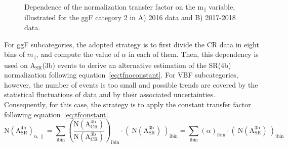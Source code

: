 \begin{figure}[htbp!]
\captionsetup[subfigure]{justification=centering}
\begin{center}
\end{center}
\caption[Dependence of the normalization transfer factor on the $\mathrm{m_{\parallel}}$ variable]{Dependence of the normalization transfer factor on the $\mathrm{m_{\parallel}}$ variable, illustrated for the ggF category 2 in A) 2016 data and B) 2017-2018 data.}
\label{fig:bkg:mdep_SF}
\end{figure}

For ggF subcategories, the adopted strategy is to first divide the CR data in eight bins of $m_{\parallel}$, and compute the value of $\alpha$ in each of them. Then, this dependency is used on $\mathrm{A_{SR}}$(3b) events to derive an alternative estimation of the SR(4b) normalization following equation~\ref{eq:tfnoconstant}. For VBF subcategories, however, the number of events is too small and possible trends are covered by the statistical fluctuations of data and by their associated uncertainties. Consequently, for this case, the strategy is to apply the constant transfer factor following equation~\ref{eq:tfconstant}. 
\begin{equation}\label{eq:tfnoconstant}
\mathrm{N(A_{SR}^{4b})_{\alpha,\parallel} = \sum_{ibin}  \left(\frac{ N(A_{CR}^{4b}) }{ N(A_{CR}^{3b}) }\right)_{ibin} \cdot  \left(~N(A_{SR}^{3b})~\right)_{ibin}  = \sum_{ibin} (\alpha)_{ibin}  \cdot  (~N(A_{SR}^{3b})~)_{ibin}   }
\end{equation}

